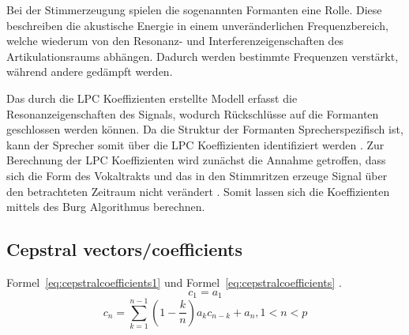 Bei der Stimmerzeugung spielen die sogenannten Formanten eine Rolle.
Diese beschreiben die akustische Energie in einem unveränderlichen Frequenzbereich, welche wiederum von den Resonanz- und Interferenzeigenschaften des Artikulationsraums abhängen.
Dadurch werden bestimmte Frequenzen verstärkt, während andere gedämpft werden.

Das durch die \ac{LPC} Koeffizienten erstellte Modell erfasst die Resonanzeigenschaften des Signals, wodurch Rückschlüsse auf die Formanten geschlossen werden können.
Da die Struktur der Formanten Sprecherspezifisch ist, kann der Sprecher somit über die \ac{LPC} Koeffizienten identifiziert werden \autocite[vgl.][S. 117]{sidorov_text-independent_2010}.
\newline
\newline
Zur Berechnung der \ac{LPC} Koeffizienten wird zunächst die Annahme getroffen, dass sich die Form des Vokaltrakts und das in den Stimmritzen erzeuge Signal über den betrachteten Zeitraum nicht verändert \autocite[vgl.][S. 1304]{atal_effectiveness_1974}.
Somit lassen sich die Koeffizienten mittels des Burg Algorithmus berechnen.


\subsection{Cepstral vectors/coefficients}
Formel~\ref{eq:cepstralcoefficients1} und Formel~\ref{eq:cepstralcoefficients} \autocite[][S. 1305]{atal_effectiveness_1974}.
\begin{equation}
  c_{1} = a_{1}
  \label{eq:cepstralcoefficients1}
\end{equation}
\begin{equation}
  c_n = \sum_{k=1}^{n-1}(1-\frac{k}{n})a_{k}c_{n-k} + a_{n} , 1 < n < p
  \label{eq:cepstralcoefficients}
\end{equation}
